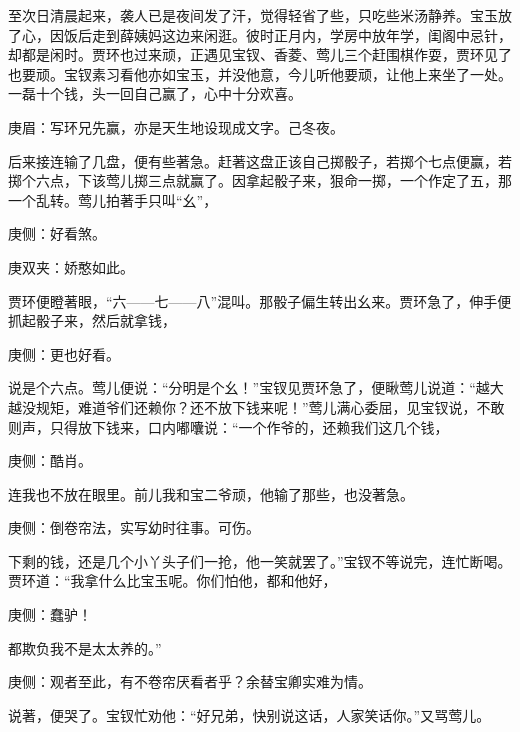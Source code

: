 \begin{parag}
    至次日清晨起来，袭人已是夜间发了汗，觉得轻省了些，只吃些米汤静养。宝玉放了心，因饭后走到薛姨妈这边来闲逛。彼时正月内，学房中放年学，闺阁中忌针，却都是闲时。贾环也过来顽，正遇见宝钗、香菱、莺儿三个赶围棋作耍，贾环见了也要顽。宝钗素习看他亦如宝玉，并没他意，今儿听他要顽，让他上来坐了一处。一磊十个钱，头一回自己赢了，心中十分欢喜。\begin{note}庚眉：写环兄先赢，亦是天生地设现成文字。己冬夜。\end{note}后来接连输了几盘，便有些著急。赶著这盘正该自己掷骰子，若掷个七点便赢，若掷个六点，下该莺儿掷三点就赢了。因拿起骰子来，狠命一掷，一个作定了五，那一个乱转。莺儿拍著手只叫“幺”，\begin{note}庚侧：好看煞。\end{note}\begin{note}庚双夹：娇憨如此。\end{note}贾环便瞪著眼，“六——七——八”混叫。那骰子偏生转出幺来。贾环急了，伸手便抓起骰子来，然后就拿钱，\begin{note}庚侧：更也好看。\end{note}说是个六点。莺儿便说：“分明是个幺！”宝钗见贾环急了，便瞅莺儿说道：“越大越没规矩，难道爷们还赖你？还不放下钱来呢！”莺儿满心委屈，见宝钗说，不敢则声，只得放下钱来，口内嘟囔说：“一个作爷的，还赖我们这几个钱，\begin{note}庚侧：酷肖。\end{note}连我也不放在眼里。前儿我和宝二爷顽，他输了那些，也没著急。\begin{note}庚侧：倒卷帘法，实写幼时往事。可伤。\end{note}下剩的钱，还是几个小丫头子们一抢，他一笑就罢了。”宝钗不等说完，连忙断喝。贾环道：“我拿什么比宝玉呢。你们怕他，都和他好，\begin{note}庚侧：蠢驴！\end{note}都欺负我不是太太养的。”\begin{note}庚侧：观者至此，有不卷帘厌看者乎？余替宝卿实难为情。\end{note}说著，便哭了。宝钗忙劝他：“好兄弟，快别说这话，人家笑话你。”又骂莺儿。
\end{parag}


